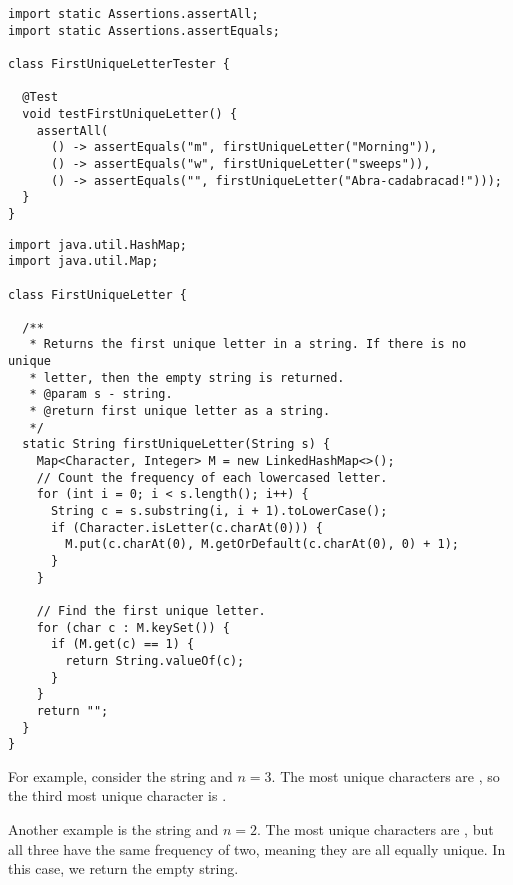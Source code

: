 \begin{lstlisting}[language=MyJava]
import static Assertions.assertAll;
import static Assertions.assertEquals;

class FirstUniqueLetterTester {

  @Test
  void testFirstUniqueLetter() {
    assertAll(
      () -> assertEquals("m", firstUniqueLetter("Morning")),
      () -> assertEquals("w", firstUniqueLetter("sweeps")),
      () -> assertEquals("", firstUniqueLetter("Abra-cadabracad!")));
  }
}
\end{lstlisting}

\begin{lstlisting}[language=MyJava]
import java.util.HashMap;
import java.util.Map;

class FirstUniqueLetter {

  /**
   * Returns the first unique letter in a string. If there is no unique
   * letter, then the empty string is returned.
   * @param s - string.
   * @return first unique letter as a string.
   */
  static String firstUniqueLetter(String s) {
    Map<Character, Integer> M = new LinkedHashMap<>();
    // Count the frequency of each lowercased letter.
    for (int i = 0; i < s.length(); i++) {
      String c = s.substring(i, i + 1).toLowerCase();
      if (Character.isLetter(c.charAt(0))) {
        M.put(c.charAt(0), M.getOrDefault(c.charAt(0), 0) + 1);
      }
    }

    // Find the first unique letter.
    for (char c : M.keySet()) {
      if (M.get(c) == 1) {
        return String.valueOf(c);
      }
    }
    return "";
  }
}
\end{lstlisting}


For example, consider the string  and $n=3$. The most unique characters are , so the third most unique character is .

Another example is the string  and $n=2$. The most unique characters are , but all three have the same frequency of two, meaning they are all equally unique. In this case, we return the empty string.

